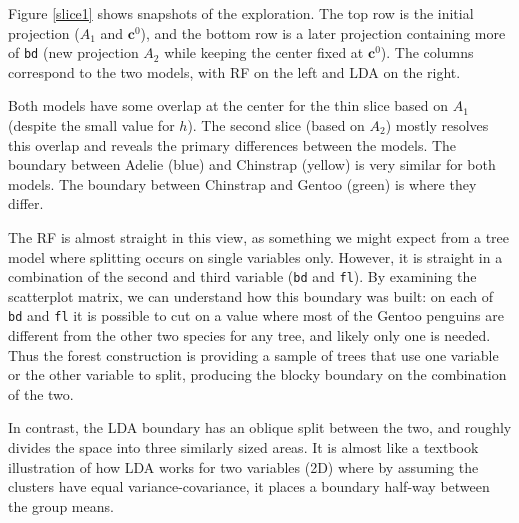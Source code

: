 \documentclass[]{interact}
\theoremstyle{plain}%
\theoremstyle{definition}
\theoremstyle{remark}
\begin{document}
Figure \ref{slice1} shows snapshots of the exploration. The top row is
the initial projection (\(A_1\) and \(\mathbf{c}^0\)), and the bottom
row is a later projection containing more of \texttt{bd} (new projection
\(A_2\) while keeping the center fixed at \(\mathbf{c}^0\)). The columns
correspond to the two models, with RF on the left and LDA on the right.

Both models have some overlap at the center for the thin slice based on
\(A_1\) (despite the small value for \(h\)). The second slice (based on
\(A_2\)) mostly resolves this overlap and reveals the primary
differences between the models. The boundary between Adelie (blue) and
Chinstrap (yellow) is very similar for both models. The boundary between
Chinstrap and Gentoo (green) is where they differ.

The RF is almost straight in this view, as something we might expect
from a tree model where splitting occurs on single variables only.
However, it is straight in a combination of the second and third
variable (\texttt{bd} and \texttt{fl}). By examining the scatterplot
matrix, we can understand how this boundary was built: on each of
\texttt{bd} and \texttt{fl} it is possible to cut on a value where most
of the Gentoo penguins are different from the other two species for any
tree, and likely only one is needed. Thus the forest construction is
providing a sample of trees that use one variable or the other variable
to split, producing the blocky boundary on the combination of the two.

In contrast, the LDA boundary has an oblique split between the two, and
roughly divides the space into three similarly sized areas. It is almost
like a textbook illustration of how LDA works for two variables (2D)
where by assuming the clusters have equal variance-covariance, it places
a boundary half-way between the group means.
\end{document}
